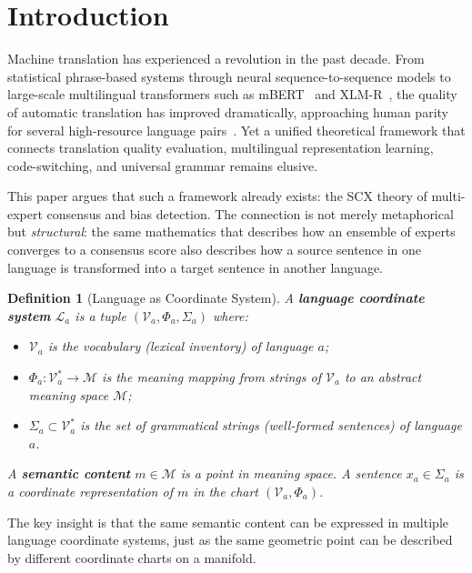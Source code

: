 \documentclass[12pt,a4paper]{article}
\newtheorem{definition}[theorem]{Definition}
\theoremstyle{remark}
\newcommand{\M}{\mathcal{M}}
\newcommand{\Lang}{\mathcal{L}}
\newcommand{\Vocab}{\mathcal{V}}
\newcommand{\SCX}{\textsf{SCX}}
\begin{document}
\section{Introduction}
\label{sec:introduction}

Machine translation has experienced a revolution in the past decade. From
statistical phrase-based systems through neural sequence-to-sequence models
to large-scale multilingual transformers such as mBERT~\cite{devlin2019bert}
and XLM-R~\cite{conneau2020unsupervised}, the quality of automatic translation
has improved dramatically, approaching human parity for several high-resource
language pairs~\cite{hassan2018achieving}. Yet a unified theoretical framework
that connects translation quality evaluation, multilingual representation
learning, code-switching, and universal grammar remains elusive.

This paper argues that such a framework already exists: the \SCX{} theory of
multi-expert consensus and bias detection. The connection is not merely
metaphorical but \emph{structural}: the same mathematics that describes
how an ensemble of experts converges to a consensus score also describes
how a source sentence in one language is transformed into a target sentence
in another language.

\begin{definition}[Language as Coordinate System]
\label{def:language_coordinate}
A \textbf{language coordinate system} $\Lang_a$ is a tuple
$(\Vocab_a, \Phi_a, \Sigma_a)$ where:
\begin{itemize}[leftmargin=*]
  \item $\Vocab_a$ is the vocabulary (lexical inventory) of language $a$;
  \item $\Phi_a: \Vocab_a^* \to \M$ is the meaning mapping from strings
        of $\Vocab_a$ to an abstract meaning space $\M$;
  \item $\Sigma_a \subset \Vocab_a^*$ is the set of grammatical strings
        (well-formed sentences) of language $a$.
\end{itemize}
A \textbf{semantic content} $m \in \M$ is a point in meaning space. A
sentence $x_a \in \Sigma_a$ is a coordinate representation of $m$ in
the chart $(\Vocab_a, \Phi_a)$.
\end{definition}

The key insight is that the same semantic content can be expressed in
multiple language coordinate systems, just as the same geometric point
can be described by different coordinate charts on a manifold.
\end{document}
